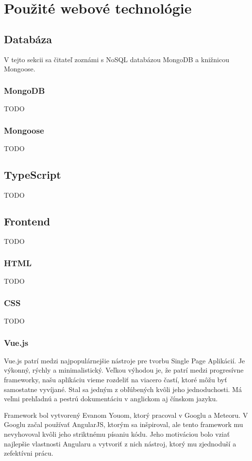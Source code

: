 \chapter{Použité webové technológie}
\section{Databáza}
V tejto sekcii sa čitateľ zoznámi s NoSQL databázou MongoDB a knižnicou Mongoose.

\subsection{MongoDB}
\label{mongodb}
TODO

\subsection{Mongoose}
TODO

\section{TypeScript}
\label{typescript}
TODO

\section{Frontend}
TODO

\subsection{HTML}
TODO

\subsection{CSS}
TODO

\subsection{Vue.js}
Vue.js\cite{vue-guide} patrí medzi najpopulárnejšie nástroje pre tvorbu Single Page Aplikácií. Je výkonný, rýchly a minimalistický. Veľkou výhodou je, že patrí medzi progresívne frameworky, našu aplikáciu vieme rozdeliť na viacero častí, ktoré môžu byť samostatne vyvíjané. Stal sa jedným z obľúbených kvôli jeho jednoduchosti. Má veľmi prehľadnú a pestrú dokumentáciu v anglickom aj čínskom jazyku.

Framework bol vytvorený Evanom Youom, ktorý pracoval v Googlu a Meteoru. V Googlu začal používať AngularJS, ktorým sa inšpiroval, ale tento framework mu nevyhovoval kvôli jeho striktnému písaniu kódu. Jeho motiváciou bolo vziať najlepšie vlastnosti Angularu a vytvoriť z nich nástroj, ktorý mu zjednoduší a zefektívni prácu.


